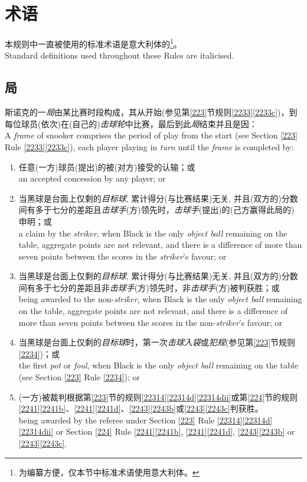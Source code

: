 \section{术语}\label{222}

\noindent 本规则中一直被使用的标准术语是意大利体的\footnote{为编纂方便，仅本节中标准术语使用意大利体。}。\\
Standard definitions used throughout these Rules are italicised.

\subsection{局}\label{2221}

\noindent 斯诺克的一\emph{局}由某比赛时段构成，其从开始(参见第\ref{223}节规则\ref{2233}\ref{2233c})，到每位球员(依次)在(自己的)\emph{击球轮}中比赛，最后到此\emph{局}结束并且是因：\\
A \emph{frame} of snooker comprises the period of play from the start (see Section \ref{223} Rule \ref{2233}\ref{2233c}), each player playing in \emph{turn} until the \emph{frame} is completed by:
\begin{enumerate}[label=(\alph*)]
    \item 任意(一方)球员(提出)的被(对方)接受的认输；或\\
    an accepted concession by any player; or
    \item 当黑球是台面上仅剩的\emph{目标球}, 累计得分(与比赛结果)无关, 并且(双方的)分数间有多于七分的差距且\emph{击球手}(方)领先时，\emph{击球手}(提出)的(己方赢得此局的)申明；或\\
    a claim by the \emph{striker}, when Black is the only \emph{object ball} remaining on the table, aggregate points are not relevant, and there is a difference of more than seven points between the scores in the \emph{striker}'s favour; or 
    \item 当黑球是台面上仅剩的\emph{目标球}, 累计得分(与比赛结果)无关, 并且(双方的)分数间有多于七分的差距且非\emph{击球手}(方)领先时，非\emph{击球手}(方)被判获胜；或\\
    being awarded to the non-\emph{striker}, when Black is the only \emph{object ball} remaining on the table, aggregate points are not relevant, and there is a difference of more than seven points between the scores in the non-\emph{striker}'s favour; or
    \item 当黑球是台面上仅剩的\emph{目标球}时，第一次\emph{击球入袋}或\emph{犯规}(参见第\ref{223}节规则\ref{2234})；或\\
    the first \emph{pot} or \emph{foul}, when Black is the only \emph{object ball} remaining on the table (see Section \ref{223} Rule \ref{2234}); or
    \item (一方)被裁判根据第\ref{223}节的规则\ref{22314}\ref{22314d}\ref{22314dii}或第\ref{224}节的规则 \ref{2241}\ref{2241b}、\ref{2241}\ref{2241d}、\ref{2243}\ref{2243b}或\ref{2243}\ref{2243c}判获胜。\\
    being awarded by the referee under Section \ref{223} Rule \ref{22314}\ref{22314d} \ref{22314dii} or Section \ref{224} Rule \ref{2241}\ref{2241b}, \ref{2241}\ref{2241d}, \ref{2243}\ref{2243b} or \ref{2243}\ref{2243c}.
\end{enumerate}

